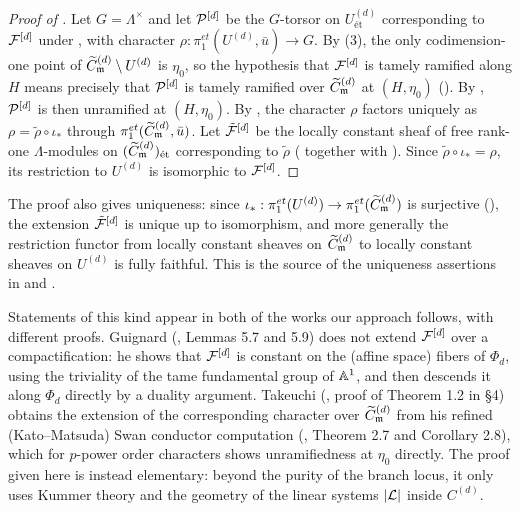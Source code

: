 \begin{proof}[Proof of ]
    Let $G = \Lambda^\times$ and let $\mathcal{P}^{[d]}$ be the $G$-torsor on $U^{(d)}_{\text{\'et}}$
    corresponding to $\mathcal{F}^{[d]}$ under , with character
    $\rho : \pi_1^{et}(U^{(d)}, \bar{u}) \to G$.
    By (3), the only codimension-one point of
    $\widetilde{C}_{\mathfrak{m}}^{(d)} \setminus U^{(d)}$ is $\eta_0$, so the hypothesis that $\mathcal{F}^{[d]}$ is tamely ramified
    along $H$ means precisely that $\mathcal{P}^{[d]}$ is tamely ramified over $\widetilde{C}_{\mathfrak{m}}^{(d)}$ at $(H, \eta_0)$
    ().
    By , $\mathcal{P}^{[d]}$ is then unramified at
    $(H, \eta_0)$. By , the character $\rho$ factors uniquely as
    $\rho = \tilde{\rho} \circ \iota_*$ through
    $\pi_1^{et}(\widetilde{C}_{\mathfrak{m}}^{(d)}, \bar{u})$. Let $\tilde{\mathcal{F}}^{[d]}$ be the locally constant sheaf of free
    rank-one $\Lambda$-modules on $(\widetilde{C}_{\mathfrak{m}}^{(d)})_{\text{\'et}}$ corresponding to $\tilde{\rho}$
    ( together with
    ). Since $\tilde{\rho} \circ \iota_* = \rho$, its restriction
    to $U^{(d)}$ is isomorphic to $\mathcal{F}^{[d]}$.
\end{proof}

\begin{rem*}
    The proof also gives uniqueness: since $\iota_* : \pi_1^{et}(U^{(d)}) \to \pi_1^{et}(\widetilde{C}_{\mathfrak{m}}^{(d)})$ is
    surjective (), the extension $\tilde{\mathcal{F}}^{[d]}$ is unique up to
    isomorphism, and more generally the restriction functor from locally constant sheaves on $\widetilde{C}_{\mathfrak{m}}^{(d)}$
    to locally constant sheaves on $U^{(d)}$ is fully faithful. This is the source of the uniqueness
    assertions in  and .
\end{rem*}

\begin{rem*}
    Statements of this kind appear in both of the works our approach follows, with different proofs.
    Guignard (\cite{Guignard2018}, Lemmas 5.7 and 5.9) does not extend $\mathcal{F}^{[d]}$ over a
    compactification: he shows that $\mathcal{F}^{[d]}$ is constant on the (affine space) fibers of $\Phi_d$,
    using the triviality of the tame fundamental group of $\mathbb{A}^1$, and then descends it along $\Phi_d$
    directly by a duality argument. Takeuchi (\cite{takeuchi2018blow}, proof of Theorem 1.2 in \S 4)
    obtains the extension of the corresponding character over $\widetilde{C}_{\mathfrak{m}}^{(d)}$ from his refined
    (Kato--Matsuda) Swan conductor computation (\cite{takeuchi2018blow}, Theorem 2.7 and Corollary 2.8),
    which for $p$-power order characters shows unramifiedness at $\eta_0$ directly.
    The proof given here is instead elementary: beyond the purity of the branch locus, it only uses
    Kummer theory and the geometry of the linear systems $|\mathcal{L}|$ inside $C^{(d)}$.
\end{rem*}
